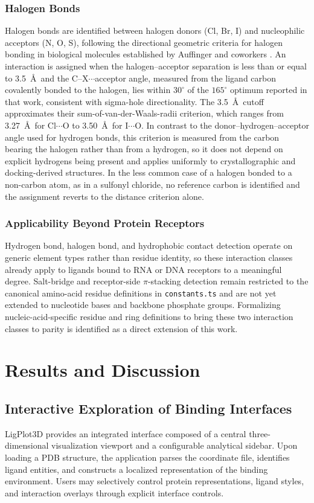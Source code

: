\documentclass[journal=jacsat,manuscript=article]{achemso}
\begin{document}
\subsubsection{Halogen Bonds}
Halogen bonds are identified between halogen donors (Cl, Br, I) and nucleophilic acceptors (N, O, S), following the directional geometric criteria for halogen bonding in biological molecules established by Auffinger and coworkers \cite{auffinger2004halogen}. An interaction is assigned when the halogen–acceptor separation is less than or equal to 3.5~\AA\ and the C–X$\cdots$acceptor angle, measured from the ligand carbon covalently bonded to the halogen, lies within $30^{\circ}$ of the $165^{\circ}$ optimum reported in that work, consistent with sigma-hole directionality. The 3.5~\AA\ cutoff approximates their sum-of-van-der-Waals-radii criterion, which ranges from 3.27~\AA\ for Cl$\cdots$O to 3.50~\AA\ for I$\cdots$O. In contrast to the donor–hydrogen–acceptor angle used for hydrogen bonds, this criterion is measured from the carbon bearing the halogen rather than from a hydrogen, so it does not depend on explicit hydrogens being present and applies uniformly to crystallographic and docking-derived structures. In the less common case of a halogen bonded to a non-carbon atom, as in a sulfonyl chloride, no reference carbon is identified and the assignment reverts to the distance criterion alone.

\subsubsection{Applicability Beyond Protein Receptors}
Hydrogen bond, halogen bond, and hydrophobic contact detection operate on generic element types rather than residue identity, so these interaction classes already apply to ligands bound to RNA or DNA receptors to a meaningful degree. Salt-bridge and receptor-side $\pi$-stacking detection remain restricted to the canonical amino-acid residue definitions in \texttt{constants.ts} and are not yet extended to nucleotide bases and backbone phosphate groups. Formalizing nucleic-acid-specific residue and ring definitions to bring these two interaction classes to parity is identified as a direct extension of this work.


\section{Results and Discussion}

\subsection{Interactive Exploration of Binding Interfaces}
LigPlot3D provides an integrated interface composed of a central three-dimensional visualization viewport and a configurable analytical sidebar. Upon loading a PDB structure, the application parses the coordinate file, identifies ligand entities, and constructs a localized representation of the binding environment. Users may selectively control protein representations, ligand styles, and interaction overlays through explicit interface controls.
\end{document}

